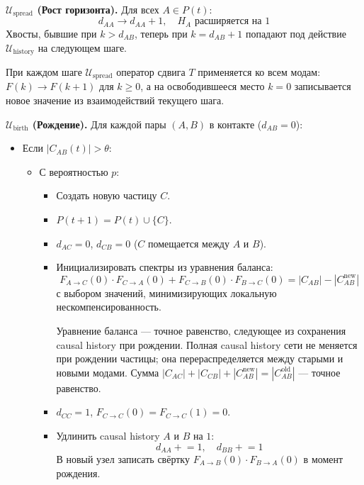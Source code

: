 \documentclass[11pt,a4paper]{article}
\theoremstyle{definition}
\begin{document}
\textbf{$\mathcal{U}_{\text{spread}}$ (Рост горизонта).}
Для всех $A \in P(t)$:
\begin{equation}
    d_{AA} \to d_{AA} + 1, \quad H_A \text{ расширяется на } 1
\end{equation}
Хвосты, бывшие при $k > d_{AB}$, теперь при $k = d_{AB}+1$ попадают под действие $\mathcal{U}_{\text{history}}$ на следующем шаге.

При каждом шаге $\mathcal{U}_{\text{spread}}$ оператор сдвига $T$ применяется ко всем модам: $F(k) \to F(k+1)$ для $k \geq 0$, а на освободившееся место $k=0$ записывается новое значение из взаимодействий текущего шага.

\textbf{$\mathcal{U}_{\text{birth}}$ (Рождение).}
Для каждой пары $(A, B)$ в контакте ($d_{AB} = 0$):
\begin{itemize}
    \item Если $|C_{AB}(t)| > \theta$:
    \begin{itemize}
        \item С вероятностью $p$:
        \begin{itemize}
            \item Создать новую частицу $C$.
            \item $P(t+1) = P(t) \cup \{C\}$.
            \item $d_{AC} = 0$, $d_{CB} = 0$ ($C$ помещается между $A$ и $B$).
            \item Инициализировать спектры из уравнения баланса:
            \begin{equation}
                F_{A \to C}(0) \cdot F_{C \to A}(0) + F_{C \to B}(0) \cdot F_{B \to C}(0) = |C_{AB}| - |C_{AB}^{\text{new}}|
            \end{equation}
            с выбором значений, минимизирующих локальную нескомпенсированность.

            Уравнение баланса --- точное равенство, следующее из сохранения causal history при рождении. Полная causal history сети не меняется при рождении частицы; она перераспределяется между старыми и новыми модами. Сумма $|C_{AC}| + |C_{CB}| + |C_{AB}^{\text{new}}| = |C_{AB}^{\text{old}}|$ --- точное равенство.
            \item $d_{CC} = 1$, $F_{C \to C}(0) = F_{C \to C}(1) = 0$.
            \item Удлинить causal history $A$ и $B$ на $1$:
            \begin{equation}
                d_{AA} \mathrel{+}= 1, \quad d_{BB} \mathrel{+}= 1
            \end{equation}
            В новый узел записать свёртку $F_{A \to B}(0) \cdot F_{B \to A}(0)$ в момент рождения.
        \end{itemize}
    \end{itemize}
\end{itemize}
\end{document}

